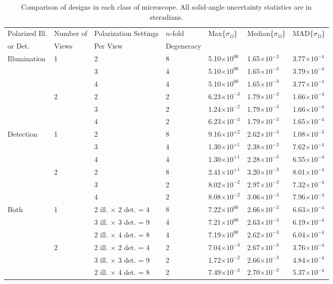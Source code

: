 \documentclass[11pt]{article}
\begin{document}
\begin{table}[ht!]
\centering
\caption{Comparison of designs in each class of microscope. All solid-angle
  uncertainty statistics are in steradians. }
\begin{tabular}{lllllll}
  \toprule
  Polarized Ill.&Number of &Polarization Settings&$n$-fold&Max\{$\sigma_{\Omega}$\}&Median\{$\sigma_{\Omega}$\}&MAD\{$\sigma_{\Omega}$\}\\ 
  or Det.&Views&Per View&Degeneracy&&&\\\midrule
  Illumination&1&2&8&5.10$\times 10^{00}$&1.65$\times 10^{-3}$&3.77$\times 10^{-4}$ \\ 
                &&3&4&5.10$\times 10^{00}$&1.65$\times 10^{-3}$&3.79$\times 10^{-4}$ \\
                &&4&4&5.10$\times 10^{00}$&1.65$\times 10^{-3}$&3.77$\times 10^{-4}$ \\\cline{2-7}  
                &2&2&2&6.23$\times 10^{-3}$&1.79$\times 10^{-3}$&1.66$\times 10^{-4}$\\
                &&3&2&1.24$\times 10^{-2}$&1.79$\times 10^{-3}$&1.66$\times 10^{-4}$\\  
                &&4&2&6.23$\times 10^{-3}$&1.79$\times 10^{-3}$&1.65$\times 10^{-4}$\\\hline  
  Detection&1&2&8&9.16$\times 10^{+2}$&2.62$\times 10^{-3}$&1.08$\times 10^{-3}$\\
                &&3&4&1.30$\times 10^{+1}$&2.38$\times 10^{-3}$&7.62$\times 10^{-4}$\\
                &&4&4&1.30$\times 10^{+1}$&2.28$\times 10^{-3}$&6.55$\times 10^{-4}$\\\cline{2-7}      
                &2&2&8&2.41$\times 10^{+1}$&3.20$\times 10^{-3}$&8.01$\times 10^{-4}$\\
                &&3&2&8.02$\times 10^{-2}$&2.97$\times 10^{-3}$&7.32$\times 10^{-4}$\\  
                &&4&2&8.08$\times 10^{-2}$&3.06$\times 10^{-3}$&7.96$\times 10^{-4}$\\\hline
  Both&1&2 ill. $\times$ 2 det. = 4&8&7.22$\times 10^{00}$&2.66$\times 10^{-3}$&6.63$\times 10^{-4}$\\
                &&3 ill. $\times$ 3 det. = 9&4&7.21$\times 10^{00}$&2.63$\times 10^{-3}$&6.19$\times 10^{-4}$\\
                &&2 ill. $\times$ 4 det. = 8&4&7.19$\times 10^{00}$&2.62$\times 10^{-3}$&6.04$\times 10^{-4}$\\\cline{2-7}      
                &2&2 ill. $\times$ 2 det. = 4&2&7.04$\times 10^{-3}$&2.67$\times 10^{-3}$&3.76$\times 10^{-4}$\\
                &&3 ill. $\times$ 3 det. = 9&2&1.72$\times 10^{-2}$&2.66$\times 10^{-3}$&4.84$\times 10^{-4}$\\
                &&2 ill. $\times$ 4 det. = 8&2&7.49$\times 10^{-3}$&2.70$\times 10^{-3}$&5.37$\times 10^{-4}$\\    
  \bottomrule
\end{tabular}
\end{table}
\end{document}
